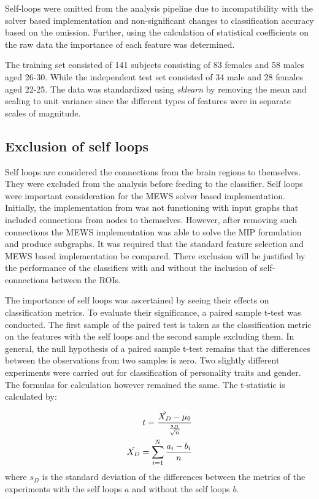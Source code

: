 \documentclass[msthesis.tex]{subfiles}
\begin{document}
Self-loops were omitted from the analysis pipeline due to incompatibility with the solver based implementation and non-significant changes to classification accuracy based on the omission. Further, using the calculation of statistical coefficients on the raw data the importance of each feature was determined. 

The training set consisted of 141 subjects consisting of 83 females and 58 males aged 26-30. While the independent test set consisted of 34 male and 28 females aged 22-25. The data was standardized using \textit{sklearn} by removing the mean and scaling to unit variance since the different types of features were in separate scales of magnitude.


\subsection{Exclusion of self loops}
\label{sec:exclusion}
Self loops are considered the connections from the brain regions to themselves. They were excluded from the analysis before feeding to the classifier. Self loops were important consideration for the MEWS solver based implementation. Initially, the implementation from \cite{DBLP:journals/corr/LobodaAS16} was not functioning with input graphs that included connections from nodes to themselves. However, after removing such connections the MEWS implementation was able to solve the MIP formulation and produce subgraphs. It was required that the standard feature selection and MEWS based implementation be compared. There exclusion will be justified by the performance of the classifiers with and without the inclusion of self-connections between the ROIs. 

The importance of self loops was ascertained by seeing their effects on classification metrics. To evaluate their significance,  a paired sample t-test was conducted. The first sample of the paired test is taken as the classification metric on the features with the self loops and the second sample excluding them. In general, the null hypothesis of a paired sample t-test remains that the differences between the observations from two samples is zero. Two slightly different experiments were carried out for classification of personality traits and gender. The formulas for calculation however remained the same. The t-statistic is calculated by:


\begin{align}
    \label{eq:pairedtest}
    t = \frac{\Tilde{X_{D}} - \mu_0}{\frac{s_{D}}{\sqrt{n}}} \\
    \Tilde{X_D} = \sum_{i=1}^{N} \frac{a_{i} - b_{i}}{n}
\end{align}where $s_D$ is the standard deviation of the differences between the metrics of the experiments with the self loops $a$ and without the self loops $b$. 
\end{document}
